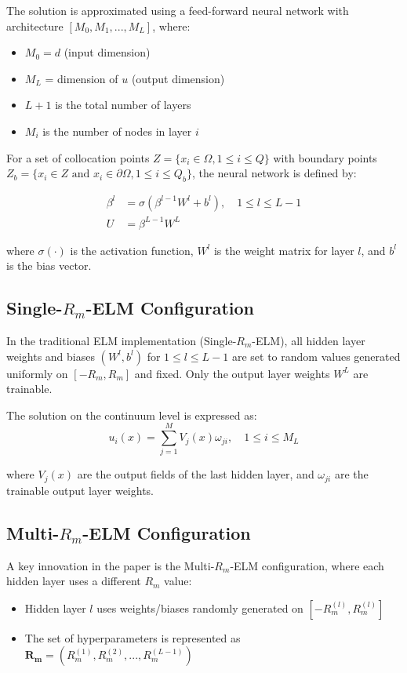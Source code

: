\documentclass[11pt,a4paper]{article}
\begin{document}
The solution is approximated using a feed-forward neural network with architecture $[M_0, M_1, ..., M_L]$, where:
\begin{itemize}
    \item $M_0 = d$ (input dimension)
    \item $M_L$ = dimension of $u$ (output dimension)
    \item $L+1$ is the total number of layers
    \item $M_i$ is the number of nodes in layer $i$
\end{itemize}

For a set of collocation points $Z = \{x_i \in \Omega, 1 \leq i \leq Q\}$ with boundary points $Z_b = \{x_i \in Z \text{ and } x_i \in \partial\Omega, 1 \leq i \leq Q_b\}$, the neural network is defined by:

\begin{align}
    \beta^l &= \sigma(\beta^{l-1}W^l + b^l), \quad 1 \leq l \leq L-1 \\
    U &= \beta^{L-1}W^L
\end{align}

where $\sigma(\cdot)$ is the activation function, $W^l$ is the weight matrix for layer $l$, and $b^l$ is the bias vector.

\subsection{Single-$R_m$-ELM Configuration}

In the traditional ELM implementation (Single-$R_m$-ELM), all hidden layer weights and biases $(W^l, b^l)$ for $1 \leq l \leq L-1$ are set to random values generated uniformly on $[-R_m, R_m]$ and fixed. Only the output layer weights $W^L$ are trainable.

The solution on the continuum level is expressed as:
\begin{equation}
    u_i(x) = \sum_{j=1}^{M} V_j(x) \omega_{ji}, \quad 1 \leq i \leq M_L
\end{equation}

where $V_j(x)$ are the output fields of the last hidden layer, and $\omega_{ji}$ are the trainable output layer weights.

\subsection{Multi-$R_m$-ELM Configuration}

A key innovation in the paper is the Multi-$R_m$-ELM configuration, where each hidden layer uses a different $R_m$ value:
\begin{itemize}
    \item Hidden layer $l$ uses weights/biases randomly generated on $[-R_m^{(l)}, R_m^{(l)}]$
    \item The set of hyperparameters is represented as $\mathbf{R_m} = (R_m^{(1)}, R_m^{(2)}, ..., R_m^{(L-1)})$
\end{itemize}
\end{document}
